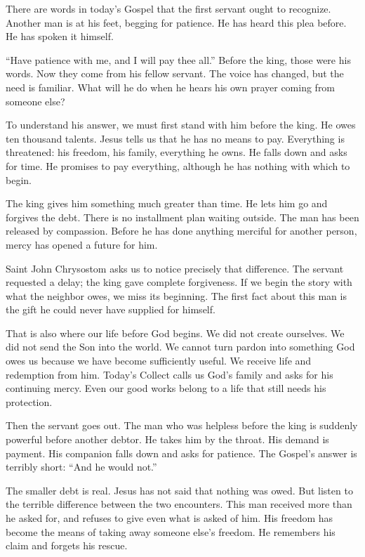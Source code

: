 There are words in today's Gospel that the first servant ought to
recognize. Another man is at his feet, begging for patience. He has heard
this plea before. He has spoken it himself.

``Have patience with me, and I will pay thee all.'' Before the king, those
were his words. Now they come from his fellow servant. The voice has
changed, but the need is familiar. What will he do when he hears his own
prayer coming from someone else?

To understand his answer, we must first stand with him before the king.
He owes ten thousand talents. Jesus tells us that he has no means to pay.
Everything is threatened: his freedom, his family, everything he owns.
He falls down and asks for time. He promises to pay everything, although
he has nothing with which to begin.

The king gives him something much greater than time. He lets him go and
forgives the debt. There is no installment plan waiting outside. The man
has been released by compassion. Before he has done anything merciful for
another person, mercy has opened a future for him.

Saint John Chrysostom asks us to notice precisely that difference. The
servant requested a delay; the king gave complete forgiveness. If we
begin the story with what the neighbor owes, we miss its beginning. The
first fact about this man is the gift he could never have supplied for
himself.

That is also where our life before God begins. We did not create
ourselves. We did not send the Son into the world. We cannot turn pardon
into something God owes us because we have become sufficiently useful.
We receive life and redemption from him. Today's Collect calls us God's
family and asks for his continuing mercy. Even our good works belong to
a life that still needs his protection.

Then the servant goes out. The man who was helpless before the king is
suddenly powerful before another debtor. He takes him by the throat.
His demand is payment. His companion falls down and asks for patience.
The Gospel's answer is terribly short: ``And he would not.''

The smaller debt is real. Jesus has not said that nothing was owed.
But listen to the terrible difference between the two encounters. This
man received more than he asked for, and refuses to give even what is
asked of him. His freedom has become the means of taking away someone
else's freedom. He remembers his claim and forgets his rescue.


